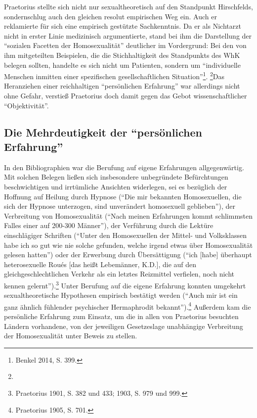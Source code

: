 \documentclass[a4paper,
fontsize=11pt,
oneside,
numbers=noperiodatend,
parskip=half-,
bibliography=totoc,
final
]{scrartcl}
\begin{document}
Praetorius stellte sich nicht nur sexualtheoretisch auf den Standpunkt
Hirschfelds, sondern\linebreak schlug auch den gleichen resolut empirischen Weg
ein. Auch er reklamierte für sich eine empirisch gestützte Sachkenntnis.
Da er als Nichtarzt nicht in erster Linie medizinisch argumentierte,
stand bei ihm die Darstellung der \enquote{sozialen Facetten der
Homosexualität} deutlicher im Vordergrund: Bei den von ihm mitgeteilten
Beispielen, die die Stichhaltigkeit des Standpunkts des WhK belegen
sollten, handelte es sich nicht um Patienten, sondern um
\enquote{individuelle Menschen inmitten einer spezifischen
gesellschaftlichen Situation}\footnote{Benkel 2014, S. 399.}. \footnote{}Das
Heranziehen einer reichhaltigen \enquote{persönlichen Erfahrung} war
allerdings nicht ohne Gefahr, verstieß Praetorius doch damit gegen das
Gebot wissenschaftlicher \enquote{Objektivität}.

\subsection*{\texorpdfstring{Die Mehrdeutigkeit der \enquote{persönlichen
Erfahrung}}{Die Mehrdeutigkeit der persönlichen Erfahrung}}\label{die-mehrdeutigkeit-der-persuxf6nlichen-erfahrung}

In den Bibliographien war die Berufung auf eigene Erfahrungen
allgegenwärtig. Mit solchen Belegen ließen sich insbesondere
unbegründete Befürchtungen beschwichtigen und irrtümliche Ansichten
widerlegen, sei es bezüglich der Hoffnung auf Heilung durch Hypnose
(\enquote{Die mir bekannten Homosexuellen, die sich der Hypnose
unterzogen, sind unverändert homosexuell geblieben}), der Verbreitung
von Homosexualität (\enquote{Nach meinen Erfahrungen kommt schlimmsten
Falles einer auf 200-300 Männer}), der Verführung durch die Lektüre
einschlägiger Schriften (\enquote{Unter den Homosexuellen der Mittel-
und Volksklassen habe ich so gut wie nie solche gefunden, welche irgend
etwas über Homosexualität gelesen hatten}) oder der Erwerbung durch
Übersättigung (\enquote{ich {[}habe{]} überhaupt heterosexuelle Roués
{[}das heißt Lebemänner, K.D.{]}, die auf den gleichgeschlechtlichen
Verkehr als ein letztes Reizmittel verfielen, noch nicht kennen
gelernt}).\footnote{Praetorius 1901, S. 382 und 433; 1903, S. 979 und
  999.} Unter Berufung auf die eigene Erfahrung konnten umgekehrt
sexualtheoretische Hypothesen empirisch bestätigt werden (\enquote{Auch
mir ist ein ganz ähnlich fühlender psychischer Hermaphrodit
bekannt}).\footnote{Praetorius 1905, S. 701.} Außerdem kam die
persönliche Erfahrung zum Einsatz, um die in allen von Praetorius
besuchten Ländern vorhandene, von der jeweiligen Gesetzeslage
unabhängige Verbreitung der Homosexualität unter Beweis zu stellen.
\end{document}
